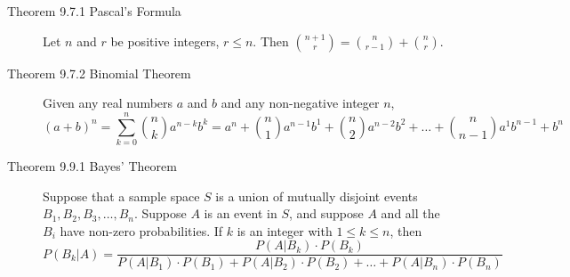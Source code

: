 \documentclass{article}
\begin{document}
\begin{description}
	\item[Theorem 9.7.1 Pascal’s Formula]Let $n$ and $r$ be positive integers, $r\leq n$. Then ${n+1\choose r}={n\choose r-1}+{n\choose r}$. 
	\item[Theorem 9.7.2 Binomial Theorem] Given any real numbers $a$ and $b$ and any non-negative integer $n$, \[(a+b)^{n}=\sum_{k=0}^{n}{n\choose k}a^{n-k}b^{k}=a^{n}+{n\choose 1}a^{n-1}b^{1} + {n\choose 2}a^{n-2}b^{2}+\dots+{n\choose n-1}a^{1}b^{n-1} + b^{n} \]
	\item[Theorem 9.9.1 Bayes’ Theorem]Suppose that a sample space $S$ is a union of mutually disjoint events $B_{1}, B_{2}, B_{3},\dots,B_{n}$. Suppose $A$ is an event in $S$, and suppose $A$ and all the $B_{i}$ have non-zero probabilities. If $k$ is an integer with $1\leq k\leq n$, then \[ P(B_{k}|A) = \frac{P(A|B_{k})\cdot P(B_{k})} {P(A|B_{1})\cdot P(B_{1})+P(A|B_{2})\cdot P(B_{2})+\dots+P(A|B_{n})\cdot P(B_{n}) } \]
	

\end{description}
\end{document}
